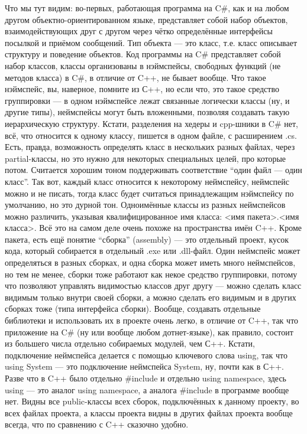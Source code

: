 \documentclass[a5paper]{article}
\begin{document}
Что мы тут видим: во-первых, работающая программа на C\#, как и на любом другом объектно-ориентированном языке, представляет собой набор объектов, взаимодействующих друг с другом через чётко определённые интерфейсы посылкой и приёмом сообщений. Тип объекта --- это класс, т.е. класс описывает структуру и поведение объектов. Код программы на C\# представляет собой набор классов, классы организованы в нэймспейсы, свободных функций (не методов класса) в C\#, в отличие от C++, не бывает вообще. Что такое нэймспейс, вы, наверное, помните из С++, но если что, это такое средство группировки --- в одном нэймспейсе лежат связанные логически классы (ну, и другие типы), неймспейсы могут быть вложенными, позволяя создавать такую иерархическую структуру. Кстати, разделения на хедеры и cpp-шники в C\# нет, всё, что относится к одному классу, пишется в одном файле, с расширением .cs. Есть, правда, возможность определять класс в нескольких разных файлах, через partial-классы, но это нужно для некоторых специальных целей, про которые потом. Считается хорошим тоном поддерживать соответствие ``один файл --- один класс''. Так вот, каждый класс относится к некоторому неймспейсу, неймспейс можно и не писать, тогда класс будет считаться принадлежащим нэймспейсу по умолчанию, но это дурной тон. Одноимённые классы из разных неймспейсов можно различить, указывая квалифицированное имя класса: <имя пакета>.<имя класса>. Всё это на самом деле очень похоже на пространства имён C++. Кроме пакета, есть ещё понятие ``сборка'' (assembly) --- это отдельный проект, кусок кода, который собирается в отдельный .exe или .dll-файл. Один неймспейс может определяться в разных сборках, и одна сборка может иметь много неймспейсов, но тем не менее, сборки тоже работают как некое средство группировки, потому что позволяют управлять видимостью классов друг другу --- можно сделать класс видимым только внутри своей сборки, а можно сделать его видимым и в других сборках тоже (типа интерфейса сборки). Вообще, создавать отдельные библиотеки и использовать их в проекте очень легко, в отличие от C++, так что приложение на C\# (ну или вообще любом дотнет-языке), как правило, состоит из большего числа отдельно собираемых модулей, чем С++. Кстати, подключение неймспейса делается с помощью ключевого слова using, так что using System --- это подключение неймспейса System, ну, почти как в С++. Разве что в C++ было отдельно \#include и отдельно using namespace, здесь using --- это аналог using namespace, а аналога \#include в программе вообще нет. Видны все public-классы всех сборок, подключённых к данному проекту, во всех файлах проекта, а классы проекта видны в других файлах проекта вообще всегда, что по сравнению с C++ сказочно удобно.
\end{document}

